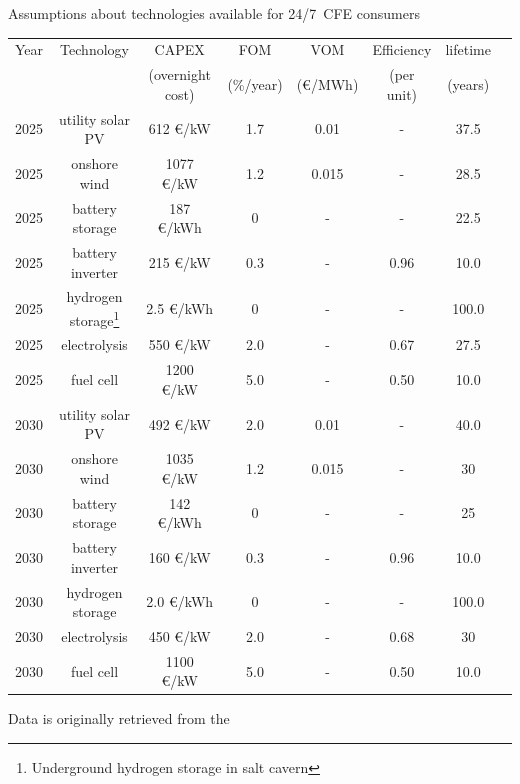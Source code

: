 \begin{frame}{Assumptions about technologies available for 24/7~CFE consumers}
  
  \centering
  {\footnotesize 

    \begin{tabular}{cccccccc}
      \hline
      \hline
      Year & Technology & CAPEX & FOM & VOM & Efficiency & lifetime \\
       &  & (overnight cost)  &  (\%/year) &  (€/MWh) & (per unit) & (years) \\
      \hline
      \hline
      2025 & utility solar PV & 612 €/kW & 1.7 & 0.01 & - & 37.5 \\
      \hline
      2025 & onshore wind & 1077 €/kW & 1.2 & 0.015 & - & 28.5 \\
      \hline
      2025 & battery storage & 187 €/kWh & 0 & - & - & 22.5 \\
      \hline
      2025  & battery inverter & 215 €/kW & 0.3 & - & 0.96  & 10.0 \\
      \hline
      2025 & hydrogen storage\footnote{{\scriptsize Underground hydrogen storage in salt cavern}} 
                  & 2.5 €/kWh & 0 & - & - & 100.0 \\
      \hline
      2025 & electrolysis & 550 €/kW & 2.0 & - & 0.67 & 27.5  \\
      \hline
      2025 & fuel cell & 1200 €/kW & 5.0 & - & 0.50 & 10.0 \\
      \hline
      \hline
      2030 & utility solar PV & 492 €/kW & 2.0 & 0.01 & - & 40.0 \\
      \hline
      2030 & onshore wind & 1035 €/kW & 1.2 & 0.015 & - & 30 \\
      \hline
      2030 & battery storage & 142 €/kWh & 0 & - & - & 25 \\
      \hline
      2030  & battery inverter & 160 €/kW & 0.3 & - & 0.96  & 10.0 \\
      \hline
      2030 & hydrogen storage  & 2.0 €/kWh & 0 & - & - & 100.0 \\
      \hline
      2030 & electrolysis & 450 €/kW & 2.0 & - & 0.68 & 30  \\
      \hline
      2030 & fuel cell & 1100 €/kW & 5.0 & - & 0.50 & 10.0 \\
      \hline
      \hline
      \end{tabular}
  
    Data is originally retrieved from the 
      \vspace{0.2cm}
  }
\end{frame}




